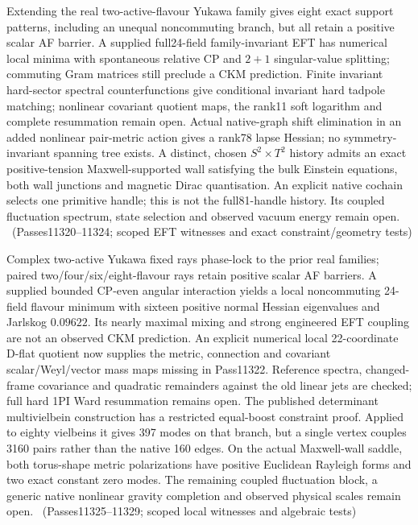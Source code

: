 Extending the real two-active-flavour Yukawa family gives eight exact support
patterns, including an unequal noncommuting branch, but all retain a positive
scalar AF barrier. A supplied full24-field family-invariant EFT has numerical
local minima with spontaneous relative CP and $2+1$ singular-value splitting;
commuting Gram matrices still preclude a CKM prediction. Finite invariant
hard-sector spectral counterfunctions give conditional invariant hard tadpole
matching; nonlinear covariant quotient maps, the
rank11 soft logarithm and complete resummation remain open. Actual native-graph
shift elimination in an added nonlinear pair-metric action gives a rank78 lapse
Hessian; no symmetry-invariant spanning tree exists. A distinct, chosen
$S^2\times T^2$ history admits an exact positive-tension Maxwell-supported wall
satisfying the bulk Einstein equations, both wall junctions and magnetic Dirac
quantisation. An explicit native cochain selects one primitive handle; this is
not the full81-handle history. Its coupled fluctuation spectrum, state selection
and observed vacuum energy remain open.
\tierC\ (Passes11320--11324; scoped EFT witnesses and exact constraint/geometry tests)

Complex two-active Yukawa fixed rays phase-lock to the prior real families;
paired two/four/six/eight-flavour rays retain positive scalar AF barriers.
A supplied bounded CP-even angular interaction yields a local noncommuting
24-field flavour minimum with sixteen positive normal Hessian eigenvalues
and Jarlskog $0.09622$. Its nearly maximal mixing and strong engineered EFT
coupling are not an observed CKM prediction. An explicit numerical local
22-coordinate D-flat quotient now supplies the metric, connection and covariant
scalar/Weyl/vector mass maps missing in Pass11322. Reference spectra,
changed-frame covariance and quadratic remainders against the old linear jets
are checked; full hard 1PI Ward resummation remains open.
The published determinant multivielbein construction has a restricted equal-boost
constraint proof. Applied to eighty vielbeins it gives 397 modes on that branch,
but a single vertex couples 3160 pairs rather than the native 160 edges.
On the actual Maxwell-wall saddle, both torus-shape metric polarizations have
positive Euclidean Rayleigh forms and two exact constant zero modes.
The remaining coupled fluctuation block, a generic native nonlinear gravity
completion and observed physical scales remain open.
\tierC\ (Passes11325--11329; scoped local witnesses and algebraic tests)

